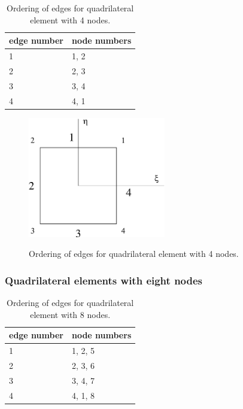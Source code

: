 \begin{table}[h]
\begin{center}
\begin{tabular}{|l|l|}
\hline
edge number & node numbers
\\ \hline
1 & 1, 2
\\ \hline
2 & 2, 3
\\ \hline
3 & 3, 4
\\ \hline
4 & 4, 1
\\ \hline
\end{tabular}
\label{tablinquadedges}
\caption{Ordering of edges for quadrilateral element with 4 nodes.}
\end{center}
\end{table}

\begin{figure}[h]
\begin{center}
\includegraphics[width=60mm]{FIG/linquadedges.eps}
\label{figlinquadedges}
\caption{Ordering of edges for quadrilateral element with 4 nodes.}
\end{center}
\end{figure}

\subsubsection{Quadrilateral elements with eight nodes}

\begin{table}[h]
\begin{center}
\begin{tabular}{|l|l|}
\hline
edge number & node numbers
\\ \hline
1 & 1, 2, 5
\\ \hline
2 & 2, 3, 6
\\ \hline
3 & 3, 4, 7
\\ \hline
4 & 4, 1, 8
\\ \hline
\end{tabular}
\label{tabquadquadedges}
\caption{Ordering of edges for quadrilateral element with 8 nodes.}
\end{center}
\end{table}

